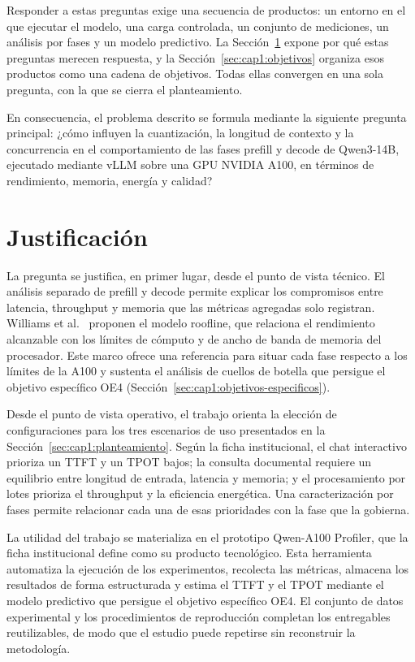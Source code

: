 Responder a estas preguntas exige una secuencia de productos: un entorno en el que ejecutar el modelo, una carga controlada, un conjunto de mediciones, un análisis por fases y un modelo predictivo. La Sección~\ref{sec:cap1:justificacion} expone por qué estas preguntas merecen respuesta, y la Sección~\ref{sec:cap1:objetivos} organiza esos productos como una cadena de objetivos. Todas ellas convergen en una sola pregunta, con la que se cierra el planteamiento.

En consecuencia, el problema descrito se formula mediante la siguiente pregunta principal: ¿cómo influyen la cuantización, la longitud de contexto y la concurrencia en el comportamiento de las fases prefill y decode de Qwen3-14B, ejecutado mediante vLLM sobre una GPU NVIDIA A100, en términos de rendimiento, memoria, energía y calidad?

\section{Justificación}
\label{sec:cap1:justificacion}

La pregunta se justifica, en primer lugar, desde el punto de vista técnico. El análisis separado de prefill y decode permite explicar los compromisos entre latencia, throughput y memoria que las métricas agregadas solo registran. Williams et al.~\cite{williams2009roofline} proponen el modelo roofline, que relaciona el rendimiento alcanzable con los límites de cómputo y de ancho de banda de memoria del procesador. Este marco ofrece una referencia para situar cada fase respecto a los límites de la A100 y sustenta el análisis de cuellos de botella que persigue el objetivo específico OE4 (Sección~\ref{sec:cap1:objetivos-especificos}).

Desde el punto de vista operativo, el trabajo orienta la elección de configuraciones para los tres escenarios de uso presentados en la Sección~\ref{sec:cap1:planteamiento}. Según la ficha institucional, el chat interactivo prioriza un TTFT y un TPOT bajos; la consulta documental requiere un equilibrio entre longitud de entrada, latencia y memoria; y el procesamiento por lotes prioriza el throughput y la eficiencia energética. Una caracterización por fases permite relacionar cada una de esas prioridades con la fase que la gobierna.

La utilidad del trabajo se materializa en el prototipo Qwen-A100 Profiler, que la ficha institucional define como su producto tecnológico. Esta herramienta automatiza la ejecución de los experimentos, recolecta las métricas, almacena los resultados de forma estructurada y estima el TTFT y el TPOT mediante el modelo predictivo que persigue el objetivo específico OE4. El conjunto de datos experimental y los procedimientos de reproducción completan los entregables reutilizables, de modo que el estudio puede repetirse sin reconstruir la metodología.


